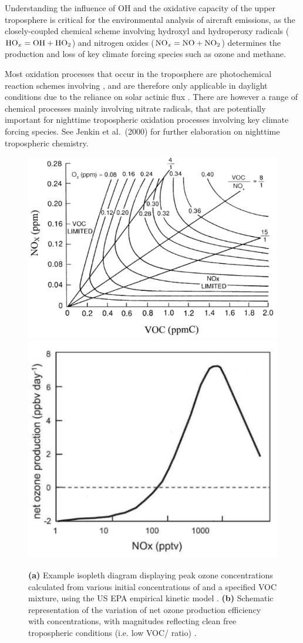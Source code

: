 
Understanding the influence of OH and the oxidative capacity of the upper troposphere is critical for the environmental analysis of aircraft emissions, as the closely-coupled chemical scheme involving hydroxyl and hydroperoxy radicals ($\ce{HO_x} = \ce{OH} + \ce{HO_2}$) and nitrogen oxides ($\ce{NO_x} = \ce{NO} + \ce{NO_2}$) determines the production and loss of key climate forcing species such as ozone and methane.

Most oxidation processes that occur in the troposphere are photochemical reaction schemes involving , and are therefore only applicable in daylight conditions due to the reliance on solar actinic flux \cite{Jacobson2005}. There are however a range of chemical processes mainly involving nitrate radicals, that are potentially important for nighttime tropospheric oxidation processes involving key climate forcing species. See Jenkin et al.\ (2000) \cite{Jenkin2000} for further elaboration on nighttime tropospheric chemistry.

\begin{figure}[H]
	\centering
	\subfloat
		{
		\includegraphics[width=.38\textwidth]{NOx-VOC_curve.png}
		\vspace{.2cm}
		\label{NO_x_VOC}
		}
	\subfloat
		{
		\includegraphics[width=.32\textwidth]{NO_x_ozone.png}
		\label{NO_x_ozone}
		}
	\caption{\textbf{(a)} Example isopleth diagram displaying peak ozone concentrations calculated from various initial concentrations of  and a specified VOC mixture, using the US EPA empirical kinetic model \cite{Dodge1977, Jenkin2000}. \textbf{(b)} Schematic representation of the variation of net ozone production efficiency with  concentrations, with magnitudes reflecting clean free tropospheric conditions (i.e. low VOC/ ratio) \cite{Monks2005}.}
	\label{}
\end{figure}

